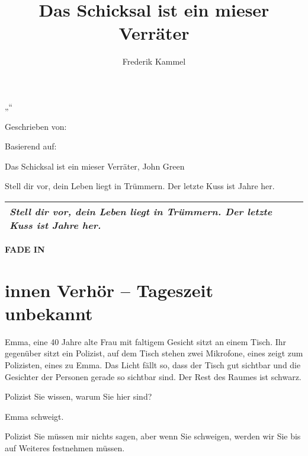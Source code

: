 \documentclass[12pt]{article}
\title{Das Schicksal ist ein mieser Verräter}
\author{Frederik Kammel}
\newenvironment{scene}[4][\unskip]{
    \textbf{\uppercase{#1}}


    \section{#2 #3 -- #4}\label{sec:scene-#3}
    }{}
\newenvironment{scenedescription}{%
    \begin{flushleft}
    }{
    \end{flushleft}
}
\newcommand{\actionline}[1]{#1}
\newcommand{\BasedOn}{Das Schicksal ist ein mieser Verräter, John Green}
\newcommand{\TitleSlug}{Stell dir vor, dein Leben liegt in Trümmern. \newline Der letzte Kuss ist Jahre her.}
\begin{document}
    \selectfont

    \begin{titlepage}
        \centering
        „\MakeUppercase{\thetitle}“

        \vspace{2cm}
        Geschrieben von:

        \theauthor

        \vspace{2cm}
        Basierend auf:

        \BasedOn

        \ifdefined\TitleSlug
        \vspace{2cm}

        \begin{adjustwidth}{1cm}{1cm}
            \begin{center}
                \begin{tabular}{ P{13cm} }
                    \hline
                    \textit{\TitleSlug} \\
                    \hline
                \end{tabular}
            \end{center}
        \end{adjustwidth}
        \fi
    \end{titlepage}


    \begin{scene}[fade in]{innen}{Verhör}{Tageszeit unbekannt}
        \begin{scenedescription}
            \gls{Emma}, eine 40 Jahre alte Frau mit faltigem Gesicht sitzt an einem Tisch.
            Ihr gegenüber sitzt ein \gls{Polizist}, auf dem Tisch stehen zwei Mikrofone, eines zeigt zum \gls{Polizist}en, eines zu Emma.
            Das Licht fällt so, dass der Tisch gut sichtbar und die Gesichter der Personen gerade so sichtbar sind.
            Der Rest des Raumes ist schwarz.
        \end{scenedescription}

        \begin{dialog}{Polizist}
            Sie wissen, warum Sie hier sind?
        \end{dialog}

        \actionline{\gls{Emma} schweigt.}

        \begin{dialog}[Fortsetzung]{Polizist}
            Sie müssen mir nichts sagen, aber wenn Sie schweigen, werden wir Sie bis auf Weiteres festnehmen müssen.
        \end{dialog}
    \end{scene}
\end{document}
